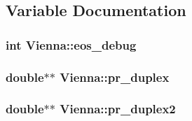 \subsection{Variable Documentation}
\hypertarget{namespace_vienna_a24d3b842931ab2ed27b801a9ea14b77f}{
\subsubsection[{eos\+\_\+debug}]{\setlength{\rightskip}{0pt plus 5cm}int Vienna\+::eos\+\_\+debug}}\label{namespace_vienna_a24d3b842931ab2ed27b801a9ea14b77f}
\hypertarget{namespace_vienna_a8238d1b2f4301ad0ed67a7e02c3bb4e3}{
\subsubsection[{pr\+\_\+duplex}]{\setlength{\rightskip}{0pt plus 5cm}double$\ast$$\ast$ Vienna\+::pr\+\_\+duplex}}\label{namespace_vienna_a8238d1b2f4301ad0ed67a7e02c3bb4e3}
\hypertarget{namespace_vienna_af212193cb67ebca5f87d42c4ab9e0196}{
\subsubsection[{pr\+\_\+duplex2}]{\setlength{\rightskip}{0pt plus 5cm}double$\ast$$\ast$ Vienna\+::pr\+\_\+duplex2}}\label{namespace_vienna_af212193cb67ebca5f87d42c4ab9e0196}
